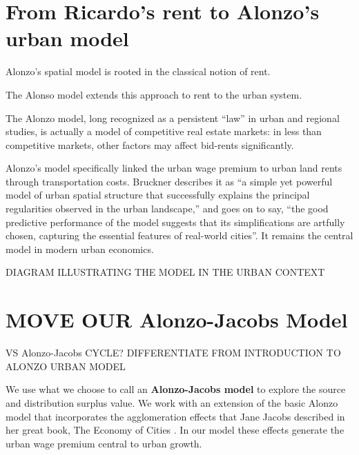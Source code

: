 \section{From Ricardo's rent to Alonzo's urban model} 

Alonzo's spatial model is rooted in the classical notion of rent. 

The Alonso model extends this approach to rent to the urban system.

The Alonzo model, long  recognized as a persistent ``law'' in urban and regional studies, is actually a model of competitive real estate markets: in less than competitive markets, other factors may affect bid-rents significantly.


 Alonzo's  model  specifically linked the urban wage premium to urban land rents through transportation costs.  
 Bruckner \cite{bruecknerStructureUrbanEquilibria1987} describes it as ``a simple yet powerful model of urban spatial structure that successfully explains the principal regularities observed in the urban landscape,'' and goes on to say, ``the good predictive performance of the model suggests that its simplifications are artfully chosen, capturing the essential features of real-world cities''. It remains the central model in modern urban economics.

 DIAGRAM ILLUSTRATING THE MODEL IN THE URBAN CONTEXT

\section{MOVE OUR Alonzo-Jacobs Model}
VS Alonzo-Jacobs CYCLE?
DIFFERENTIATE FROM INTRODUCTION TO ALONZO URBAN MODEL


We use what we choose to call an \textbf{\gls{Alonzo-Jacobs model}}  to explore the source and distribution surplus value. We  work with an extension of the basic Alonzo model that incorporates the \gls{agglomeration effects} that Jane Jacobs  described in her great book, The Economy of Cities \cite{jacobsEconomyCities1969}. In our model these effects generate the \gls{urban wage premium} central to urban growth. %

